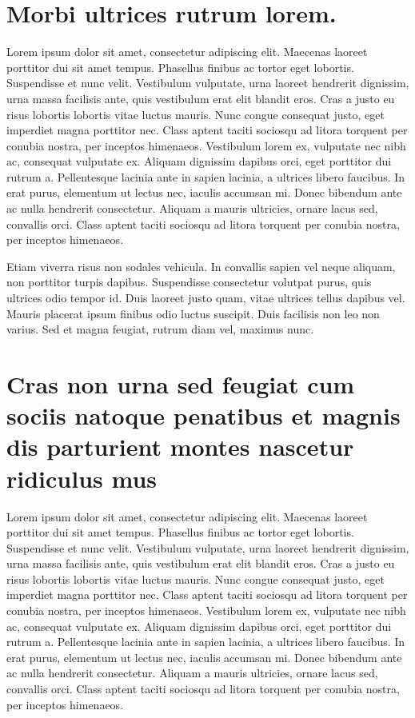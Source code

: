 \begin{anexosenv}

\partanexos

\chapter{Morbi ultrices rutrum lorem.}

Lorem ipsum dolor sit amet, consectetur adipiscing elit. Maecenas laoreet porttitor dui sit amet tempus. Phasellus finibus ac tortor eget lobortis. Suspendisse et nunc velit. Vestibulum vulputate, urna laoreet hendrerit dignissim, urna massa facilisis ante, quis vestibulum erat elit blandit eros. Cras a justo eu risus lobortis lobortis vitae luctus mauris. Nunc congue consequat justo, eget imperdiet magna porttitor nec. Class aptent taciti sociosqu ad litora torquent per conubia nostra, per inceptos himenaeos. Vestibulum lorem ex, vulputate nec nibh ac, consequat vulputate ex. Aliquam dignissim dapibus orci, eget porttitor dui rutrum a. Pellentesque lacinia ante in sapien lacinia, a ultrices libero faucibus. In erat purus, elementum ut lectus nec, iaculis accumsan mi. Donec bibendum ante ac nulla hendrerit consectetur. Aliquam a mauris ultricies, ornare lacus sed, convallis orci. Class aptent taciti sociosqu ad litora torquent per conubia nostra, per inceptos himenaeos.

Etiam viverra risus non sodales vehicula. In convallis sapien vel neque aliquam, non porttitor turpis dapibus. Suspendisse consectetur volutpat purus, quis ultrices odio tempor id. Duis laoreet justo quam, vitae ultrices tellus dapibus vel. Mauris placerat ipsum finibus odio luctus suscipit. Duis facilisis non leo non varius. Sed et magna feugiat, rutrum diam vel, maximus nunc.

\chapter{Cras non urna sed feugiat cum sociis natoque penatibus et magnis dis
parturient montes nascetur ridiculus mus}


Lorem ipsum dolor sit amet, consectetur adipiscing elit. Maecenas laoreet porttitor dui sit amet tempus. Phasellus finibus ac tortor eget lobortis. Suspendisse et nunc velit. Vestibulum vulputate, urna laoreet hendrerit dignissim, urna massa facilisis ante, quis vestibulum erat elit blandit eros. Cras a justo eu risus lobortis lobortis vitae luctus mauris. Nunc congue consequat justo, eget imperdiet magna porttitor nec. Class aptent taciti sociosqu ad litora torquent per conubia nostra, per inceptos himenaeos. Vestibulum lorem ex, vulputate nec nibh ac, consequat vulputate ex. Aliquam dignissim dapibus orci, eget porttitor dui rutrum a. Pellentesque lacinia ante in sapien lacinia, a ultrices libero faucibus. In erat purus, elementum ut lectus nec, iaculis accumsan mi. Donec bibendum ante ac nulla hendrerit consectetur. Aliquam a mauris ultricies, ornare lacus sed, convallis orci. Class aptent taciti sociosqu ad litora torquent per conubia nostra, per inceptos himenaeos.


\end{anexosenv}
